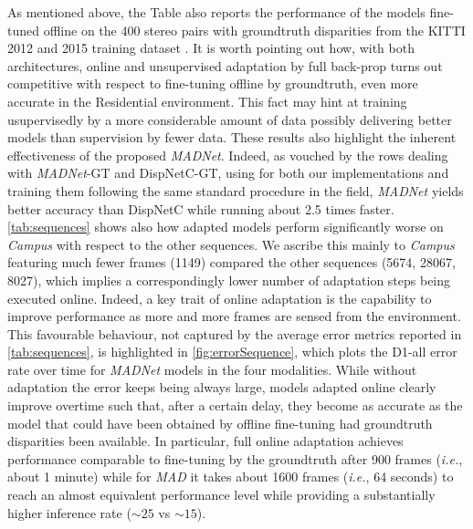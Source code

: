 \documentclass[10pt,twocolumn,letterpaper]{article}
\def\ie{\emph{i.e.}}
\def\netname{\emph{MADNet}}
\def\algoname{\emph{MAD}}
\def\kitti{KITTI}
\begin{document}
As mentioned above, the Table also reports the performance of the models fine-tuned offline on the 400 stereo pairs with groundtruth disparities from the \kitti{} 2012 and 2015 training dataset \cite{KITTI_2015,KITTI_2012}. It is worth pointing out how, with both architectures, online and unsupervised adaptation by full back-prop turns out competitive with respect to fine-tuning offline by groundtruth, even more accurate in the Residential environment. This fact may hint at training usupervisedly by a more considerable amount of data possibly delivering better models than supervision by fewer data. 
These results also highlight the inherent effectiveness of the proposed \netname{}. Indeed, as vouched by the rows dealing with  \netname{}-GT and DispNetC-GT, using for both our implementations and training them following the same standard procedure in the field, \netname{} yields better accuracy than DispNetC while running about 2.5 times faster.   
\autoref{tab:sequences} shows also how adapted models perform significantly worse on \textit{Campus} with respect to the other sequences. We ascribe this mainly to  \textit{Campus} featuring much fewer frames (1149) compared the other sequences (5674, 28067, 8027), which implies a correspondingly lower number of adaptation steps being executed online. Indeed, a key trait of online adaptation is the capability to improve performance as more and more frames are sensed from the environment. This favourable behaviour, not captured by the average error metrics reported in \autoref{tab:sequences}, is highlighted in \autoref{fig:errorSequence}, which plots the D1-all error rate over time for \netname{} models in the four modalities. While without adaptation the error keeps being always large, models adapted online clearly improve overtime such that, after a certain delay, they become as accurate as the model that could have been obtained by offline fine-tuning had groundtruth disparities been available. In particular, full online adaptation achieves performance comparable to fine-tuning by the groundtruth after 900 frames (\ie, about 1 minute) while for \algoname{} it takes about 1600 frames (\ie, 64 seconds) to reach an almost equivalent performance level while providing a substantially higher inference rate ($\sim25$ vs $\sim15$).      
\end{document}

